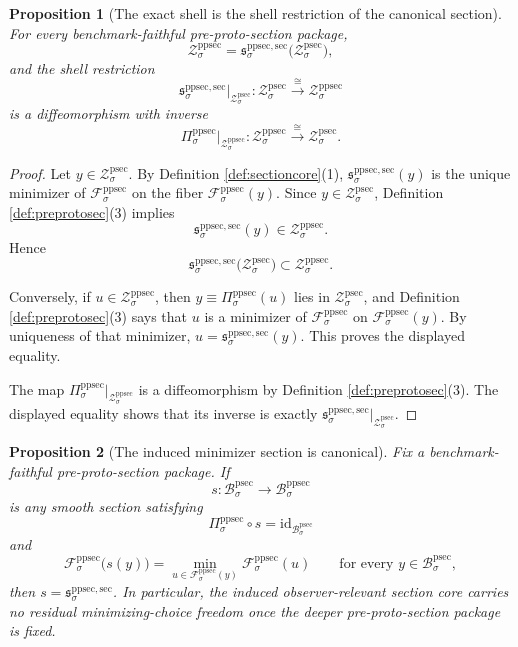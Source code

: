 \documentclass[11pt]{article}
\newcommand{\ProtoSectionBody}[1]{\mathcal B_{#1}^{\mathrm{psec}}}
\newcommand{\ProtoSectionShell}[1]{\mathcal Z_{#1}^{\mathrm{psec}}}
\newcommand{\PreProtoSectionBody}[1]{\mathcal B_{#1}^{\mathrm{ppsec}}}
\newcommand{\PreProtoSectionProj}[1]{\Pi_{#1}^{\mathrm{ppsec}}}
\newcommand{\PreProtoSectionFiber}[2]{\mathcal F_{#1}^{\mathrm{ppsec}}(#2)}
\newcommand{\PreProtoSectionFunctional}[1]{\mathscr F_{#1}^{\mathrm{ppsec}}}
\newcommand{\PreProtoSectionShell}[1]{\mathcal Z_{#1}^{\mathrm{ppsec}}}
\newcommand{\PreProtoSectionMinSection}[1]{\mathfrak s_{#1}^{\mathrm{ppsec,sec}}}
\newtheorem{proposition}{Proposition}
\begin{document}
\begin{proposition}[The exact shell is the shell restriction of the canonical section]
\label{prop:shell}
For every benchmark-faithful pre-proto-section package,
\[
\PreProtoSectionShell{\sigma}
=
\PreProtoSectionMinSection{\sigma}\bigl(\ProtoSectionShell{\sigma}\bigr),
\]
and the shell restriction
\[
\PreProtoSectionMinSection{\sigma}\big|_{\ProtoSectionShell{\sigma}}
:
\ProtoSectionShell{\sigma}\xrightarrow{\cong}\PreProtoSectionShell{\sigma}
\]
is a diffeomorphism with inverse
\[
\PreProtoSectionProj{\sigma}\big|_{\PreProtoSectionShell{\sigma}}
:
\PreProtoSectionShell{\sigma}\xrightarrow{\cong}\ProtoSectionShell{\sigma}.
\]
\end{proposition}

\begin{proof}
Let \(y\in\ProtoSectionShell{\sigma}\). By Definition \ref{def:sectioncore}(1), \(\PreProtoSectionMinSection{\sigma}(y)\) is the unique minimizer of \(\PreProtoSectionFunctional{\sigma}\) on the fiber \(\PreProtoSectionFiber{\sigma}{y}\). Since \(y\in\ProtoSectionShell{\sigma}\), Definition \ref{def:preprotosec}(3) implies
\[
\PreProtoSectionMinSection{\sigma}(y)\in\PreProtoSectionShell{\sigma}.
\]
Hence
\[
\PreProtoSectionMinSection{\sigma}\bigl(\ProtoSectionShell{\sigma}\bigr)\subset\PreProtoSectionShell{\sigma}.
\]

Conversely, if \(u\in\PreProtoSectionShell{\sigma}\), then \(y\equiv\PreProtoSectionProj{\sigma}(u)\) lies in \(\ProtoSectionShell{\sigma}\), and Definition \ref{def:preprotosec}(3) says that \(u\) is a minimizer of \(\PreProtoSectionFunctional{\sigma}\) on \(\PreProtoSectionFiber{\sigma}{y}\). By uniqueness of that minimizer, \(u=\PreProtoSectionMinSection{\sigma}(y)\). This proves the displayed equality.

The map \(\PreProtoSectionProj{\sigma}\big|_{\PreProtoSectionShell{\sigma}}\) is a diffeomorphism by Definition \ref{def:preprotosec}(3). The displayed equality shows that its inverse is exactly \(\PreProtoSectionMinSection{\sigma}\big|_{\ProtoSectionShell{\sigma}}\).
\end{proof}

\begin{proposition}[The induced minimizer section is canonical]
\label{prop:canonical}
Fix a benchmark-faithful pre-proto-section package. If
\[
s:\ProtoSectionBody{\sigma}\to\PreProtoSectionBody{\sigma}
\]
is any smooth section satisfying
\[
\PreProtoSectionProj{\sigma}\circ s
=
\mathrm{id}_{\ProtoSectionBody{\sigma}}
\]
and
\[
\PreProtoSectionFunctional{\sigma}\bigl(s(y)\bigr)
=
\min_{u\in\PreProtoSectionFiber{\sigma}{y}}
\PreProtoSectionFunctional{\sigma}(u)
\qquad
\text{for every }
y\in\ProtoSectionBody{\sigma},
\]
then \(s=\PreProtoSectionMinSection{\sigma}\). In particular, the induced observer-relevant section core carries no residual minimizing-choice freedom once the deeper pre-proto-section package is fixed.
\end{proposition}
\end{document}

